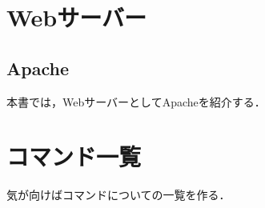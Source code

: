 \documentclass[dvipdfmx,a4paper,11pt]{jsbook}
\begin{document}
\begin{subbox}[viとvim]

\end{subbox}



\chapter{Webサーバー}
\section{Apache}
本書では，WebサーバーとしてApacheを紹介する．\\






\appendix
\chapter{コマンド一覧}
気が向けばコマンドについての一覧を作る．
\end{document}
